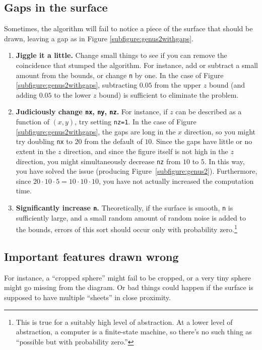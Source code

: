 \documentclass{article}
\begin{document}
\subsection{Gaps in the surface}\label{subsection:gapsinsurface}
Sometimes, the algorithm will fail to notice a piece of the surface that should 
be drawn, leaving a gap as in Figure \ref{subfigure:genus2withgaps}.
\begin{enumerate}
\item \textbf{Jiggle it a little.} Change small things to see if you can remove 
the coincidence that stumped the algorithm. For instance, add or subtract a 
small amount from the bounds, or change \lstinline!n! by one. In 
the case of Figure \ref{subfigure:genus2withgaps}, subtracting $0.05$ from the 
upper $z$ bound (and adding $0.05$ to the lower $z$ bound) is sufficient to 
eliminate the problem.
\item \textbf{Judiciously change \lstinline!nx!, \lstinline!ny!, \lstinline!nz!.}
For instance, if $z$ can be described as a function of $(x,y)$, try setting 
\lstinline!nz=1!.
In the case of Figure \ref{subfigure:genus2withgaps}, the gaps are long 
in the $x$ direction, so you might try doubling \lstinline!nx! to $20$ from 
the default of $10$. Since the gaps have little or no extent in the 
$z$ direction, and since the figure itself is not high in the $z$ direction, 
you might simultaneously decrease \lstinline!nz! from $10$ to $5$. In this 
way, you have solved the issue (producing 
Figure~\ref{subfigure:genus2}). Furthermore, since 
$20 \cdot 10 \cdot 5 = 10 \cdot 10 \cdot 10$, you have not actually 
increased the computation time.
\item \textbf{Significantly increase \lstinline!n!.} Theoretically, if 
the surface is smooth, \lstinline!n! is sufficiently large, and a small random 
amount of random noise is added to the bounds, errors of this sort should occur 
only with probability zero.\footnote{This is true for a suitably high level of 
abstraction. At a lower level of abstraction, a computer is a finite-state 
machine, so there's no such thing as ``possible but with probability zero.''}
\end{enumerate}
\subsection{Important features drawn wrong}
For instance, a ``cropped sphere'' might fail to be cropped, or a very tiny 
sphere might go missing from the diagram. Or bad things could happen if the 
surface is supposed to have multiple ``sheets'' in close proximity. 
\end{document}
